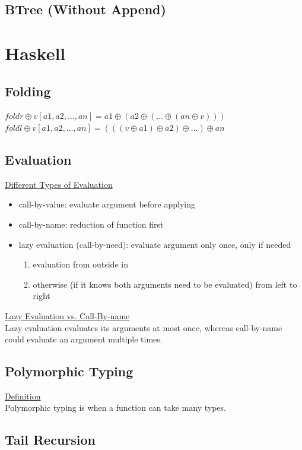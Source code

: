 \documentclass[10pt,landscape,a4paper]{article}
\begin{document}
\begin{multicols*}{5}
\subsection*{BTree (Without Append)}

\section{Haskell}

\subsection*{Folding}
\(foldr \oplus v [a1,a2,\ldots,an] = a1 \oplus (a2 \oplus (\ldots \oplus (an \oplus v)))\) \\
\(foldl \oplus v [a1,a2,\ldots,an] = (((v \oplus a1) \oplus a2) \oplus \ldots) \oplus an\)

\subsection*{Evaluation}
\underline{Different Types of Evaluation}
\begin{itemize}
    \item call-by-value: evaluate argument before applying
    \item call-by-name:  reduction of function first
    \item lazy evaluation (call-by-need): evaluate argument only once, only if needed
    \begin{enumerate}
        \item evaluation from outside in
        \item otherwise (if it knows both arguments need to be evaluated)
        from left to right
    \end{enumerate}
\end{itemize}
\underline{Lazy Evaluation vs. Call-By-name} \\
Lazy evaluation evaluates its arguments at most once, whereas call-by-name could evaluate an argument multiple times.

\subsection*{Polymorphic Typing}
\underline{Definition} \\
Polymorphic typing is when a function can take many types.

\subsection*{Tail Recursion}


\end{multicols*}
\end{document}
